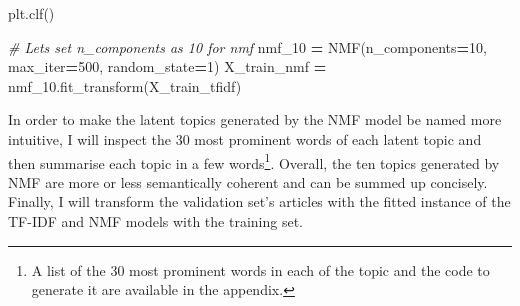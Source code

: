 \documentclass[a4paper, oneside]{report}
\newenvironment{Shaded}{\begin{snugshade}}{\end{snugshade}}
\newcommand{\CommentTok}[1]{\textcolor[rgb]{0.56,0.35,0.01}{\textit{#1}}}
\newcommand{\DecValTok}[1]{\textcolor[rgb]{0.00,0.00,0.81}{#1}}
\newcommand{\NormalTok}[1]{#1}
\newcommand{\OperatorTok}[1]{\textcolor[rgb]{0.81,0.36,0.00}{\textbf{#1}}}
\renewenvironment{Shaded}
{
  \vspace{4pt}%
  \begin{snugshade}%
}{%
  \end{snugshade}%
  \vspace{4pt}%
}
\begin{document}
\begin{Shaded}
\begin{Highlighting}[]
\NormalTok{plt.clf()}

\CommentTok{\# Let\textquotesingle{}s set n\_components as 10 for nmf}
\NormalTok{nmf\_10 }\OperatorTok{=}\NormalTok{ NMF(n\_components}\OperatorTok{=}\DecValTok{10}\NormalTok{, max\_iter}\OperatorTok{=}\DecValTok{500}\NormalTok{, random\_state}\OperatorTok{=}\DecValTok{1}\NormalTok{)}
\NormalTok{X\_train\_nmf }\OperatorTok{=}\NormalTok{ nmf\_10.fit\_transform(X\_train\_tfidf)}
\end{Highlighting}
\end{Shaded}

In order to make the latent topics generated by the NMF model be named
more intuitive, I will inspect the 30 most prominent words of each
latent topic and then summarise each topic in a few words\footnote{A
  list of the 30 most prominent words in each of the topic and the code
  to generate it are available in the appendix.}. Overall, the ten
topics generated by NMF are more or less semantically coherent and can
be summed up concisely. Finally, I will transform the validation set's
articles with the fitted instance of the TF-IDF and NMF models with the
training set.
\end{document}
